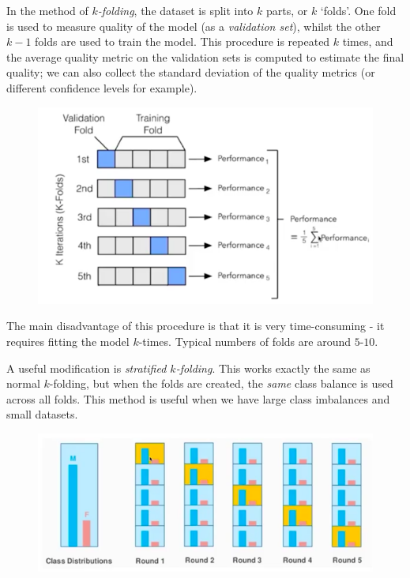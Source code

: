 \begin{framedef}
In the method of \textit{$k$-folding}, the dataset is split into $k$ parts, or $k$ `folds'. One fold is used to measure quality of the model (as a \textit{validation set}), whilst the other $k-1$ folds are used to train the model. This procedure is repeated $k$ times, and the average quality metric on the validation sets is computed to estimate the final quality; we can also collect the standard deviation of the quality metrics (or different confidence levels for example).
\begin{figure}[H]
\centering
\includegraphics[scale=0.3]{kfolding.png}
\end{figure}
The main disadvantage of this procedure is that it is very time-consuming - it requires fitting the model $k$-times. Typical numbers of folds are around $5$-$10$.
\end{framedef}

A useful modification is \textit{stratified $k$-folding}. This works exactly the same as normal $k$-folding, but when the folds are created, the \textit{same} class balance is used across all folds. This method is useful when we have large class imbalances and small datasets.
\begin{figure}[H]
\centering
\includegraphics[scale=0.3]{stratifiedkfolding.png}
\end{figure}

